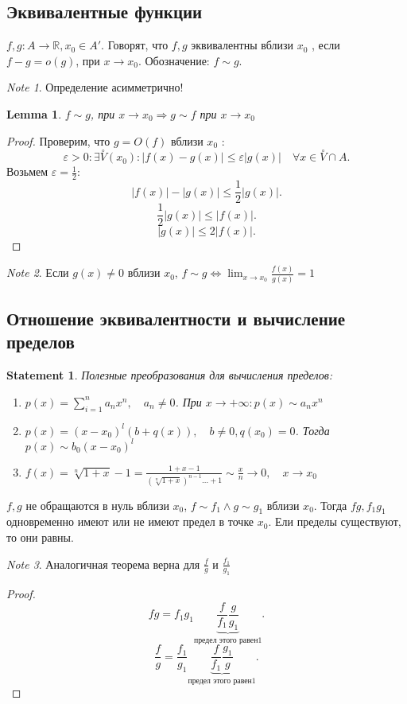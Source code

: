 \documentclass[11pt]{book}
\newcommand{\R}{\mathbb{R}}
\newcommand{\slim}{\sum\limits}
\newcommand{\pivi}{\stackrel \circ }
\renewcommand{\le}{\leqslant}
\theoremstyle{definition}
\theoremstyle{plain}
\theoremstyle{plain}
\newtheorem*{lm}{Lemma}
\newtheorem*{st}{Statement}
\theoremstyle{definition}
\theoremstyle{remark}
\newtheorem*{note}{Note}
\begin{document}
\subsection{Эквивалентные функции}\label{ques_40}
\begin{defn}
    $f, g : A \to  \R, x_0 \in A'$. Говорят, что $f, g$ эквивалентны вблизи $x_0$ , если $f-g = o(g)$, при $x \to  x_0$. Обозначение: $f \sim g$.
\end{defn}
\begin{note}
    Определение асимметрично!
\end{note}
\begin{lm}
    $f \sim g$, при $x \to  x_0 \Longrightarrow g \sim f$ при $x \to  x_0$
\end{lm}
\begin{proof}
    Проверим, что $g = O(f)$ вблизи  $x_0$ :
    \[
	\varepsilon >0: \exists \pivi V(x_0): |f(x) - g(x)| \le \varepsilon |g(x)| \quad \forall x \in  \pivi V \cap A
    .\] 
    Возьмем $\varepsilon =\frac{1}{2}$:
    \[
	|f(x)| - |g(x)| \le \frac{1}{2} |g(x)|
    .\] 
    \[
	\frac{1}{2} |g(x)| \le  |f(x)|
    .\] 
    \[
 |g(x)| \le  2|f(x)|
    .\] 
\end{proof}
\begin{note}
    Если $g(x) \ne 0$ вблизи $x_0$, $f \sim g \Longleftrightarrow \lim_{x \to  x_0} \frac{f(x)}{g(x)} =1$
\end{note}
\subsection{Отношение эквивалентности и вычисление пределов}\label{ques_41}
\begin{st}
    Полезные преобразования для вычисления пределов:
    \begin{enumerate}
	\item $p(x) = \slim_{i = 1}^n a_n x^n, \quad a_n \ne 0$. При $x \to +\infty : p(x) \sim a_n x^n$ 
	\item  $p(x) = (x -x_0) ^l (b + q(x)), \quad b \ne 0, q(x_0) = 0$. Тогда $p(x) \sim b_0(x-x_0)^l$
	\item $f(x) = \sqrt[n]{1+x} -1 = \frac{1 + x -1}{(\sqrt[n]{1 + x})^{n-1} \ldots + 1} \sim \frac{x}{n} \to 0, \quad x \to x_0$
    \end{enumerate}
\end{st}
\begin{thm}
    $f, g$ не обращаются в нуль вблизи $x_0$, $f\sim f_1 \wedge g\sim g_1$ вблизи $x_0$. Тогда $fg, f_1g_1$ одновременно имеют или не имеют предел в точке $x_0$. Ели пределы существуют, то они равны.
\end{thm}
\begin{note}
    Аналогичная теорема верна для $\frac{f}{g}$ и $\frac{f_1}{g_1}$
\end{note}
\begin{proof}
    \[
	fg = f_1g_1 \underbrace{\frac{f}{f_1} \frac{g}{g_1}}_{\mbox{предел этого равен} 1}
    .\] 
    \[
	\frac{f}{g} = \frac{f_1}{g_1} \underbrace{\frac{f}{f_1} \frac{g_1}{g}}_{\mbox{предел этого равен} 1}
    .\] 
\end{proof}
\end{document}
